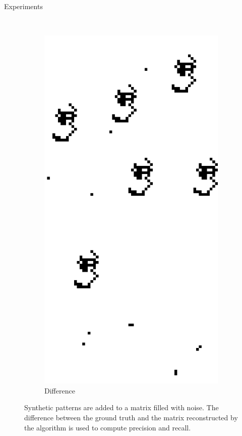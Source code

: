 \documentclass[11pt]{beamer}
\begin{document}
\begin{frame}{Experiments}
\begin{figure}[t]
\begin{subfigure}[t]{0.25\textwidth}
\label{fig:rilc}
\end{subfigure}%
~
\begin{subfigure}[t]{0.25\textwidth}
\centering
\includegraphics[scale=.8]{exp_diff_2.png}
\caption{Difference}
\label{fig:rild}
\end{subfigure}%
\caption{Synthetic patterns are added to a matrix filled with noise. The difference between the ground truth and the matrix reconstructed by the algorithm is used to compute precision and recall.}
\label{fig:ril}
\end{figure}  

\end{frame}
\end{document}
